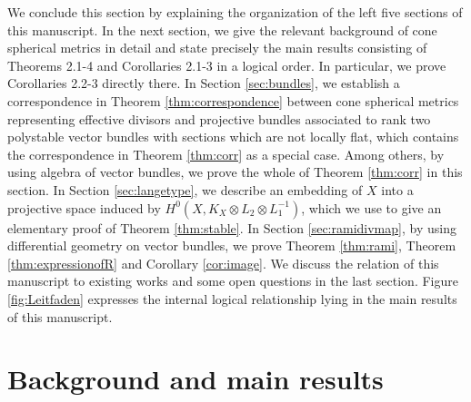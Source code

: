 \documentclass[12pt]{article}
\begin{document}
We conclude this section by explaining the organization of the left five sections of this manuscript.
In the next section, we give the relevant background of cone spherical metrics in detail and state precisely the main results consisting of Theorems 2.1-4 and Corollaries 2.1-3 in a logical order. In particular, we prove Corollaries 2.2-3 directly there.
In Section \ref{sec:bundles}, we establish a correspondence in Theorem \ref{thm:correspondence}
between cone spherical metrics representing effective divisors and projective bundles associated to rank two polystable vector bundles with sections which are not locally flat, which contains the correspondence in Theorem \ref{thm:corr} as a special case. Among others, by using algebra of vector bundles, we prove the whole of Theorem \ref{thm:corr} in this section. In Section \ref{sec:langetype}, we describe an embedding of $X$ into a projective space induced by $H^0(X, K_X\otimes L_{2} \otimes L_{1}^{-1})$, which we use to give an elementary proof of Theorem \ref{thm:stable}. In Section \ref{sec:ramidivmap}, by using differential geometry on vector bundles, we prove Theorem \ref{thm:rami}, Theorem \ref{thm:expressionofR} and Corollary \ref{cor:image}. We discuss the relation of this manuscript to existing works and some open questions in the last section. Figure \ref{fig:Leitfaden} expresses the internal logical relationship lying in the main results of this manuscript.


\section{Background and main results}
\label{main}
\end{document}
